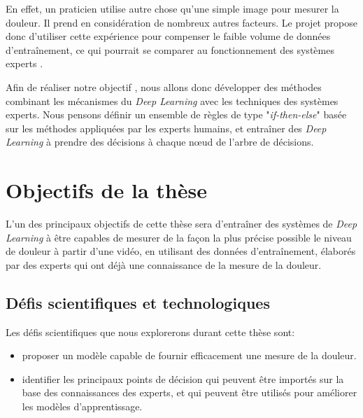 \documentclass[french]{article}
\begin{document}
En effet, un praticien utilise autre chose qu’une simple image pour mesurer la
douleur. Il prend en considération de nombreux autres facteurs. Le projet
propose donc d’utiliser cette expérience pour compenser le faible volume de
données d’entraînement, ce qui pourrait se comparer au fonctionnement des
systèmes experts \cite{giarratano1998expert}.

Afin de réaliser notre objectif , nous allons donc développer des méthodes
combinant les mécanismes du \emph{Deep Learning} avec les techniques des systèmes
experts. Nous pensons définir un ensemble de règles de type "\emph{if-then-else}" basée
sur les méthodes appliquées par les experts humains, et entraîner des
\emph{Deep Learning} à prendre des décisions à chaque nœud de l’arbre de décisions.


\section{Objectifs de la thèse}
\label{sec:orgf2f9c8d}


L’un des  principaux objectifs de cette  thèse sera d’entraîner des  systèmes de
\emph{Deep Learning}  à être  capables de  mesurer de la  façon la  plus précise
possible le  niveau de douleur  à partir d'une  vidéo, en utilisant  des données
d'entra\^inement, élaborés par  des experts qui ont déjà une  connaissance de la
mesure de la douleur.




\subsection{Défis scientifiques et technologiques}
\label{sec:orgb1aac1c}


Les défis scientifiques que nous explorerons durant cette thèse sont:
\begin{itemize}
\item proposer un modèle capable de fournir efficacement une mesure de la douleur.
\item identifier les principaux points de décision qui peuvent être importés sur la
base des connaissances des experts, et qui peuvent être utilisés pour
améliorer les modèles d’apprentissage.
\end{itemize}
\end{document}
